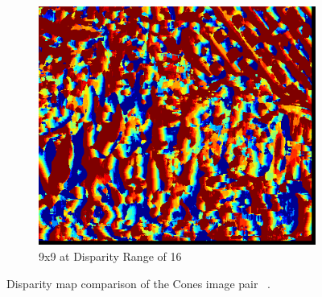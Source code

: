 \begin{figure}
\begin{center}
\begin{subfigure}{0.45\textwidth}
		\includegraphics[width=\textwidth]{figures/cones_9x9_python3.png}
		\caption{9x9 at Disparity Range of 16}
		\label{fig:conesPy}
	\end{subfigure}
	\captionfonts
	\caption{Disparity map comparison of the Cones image pair ~\cite{middlebury}.}
	\label{fig:conesDispMap}
\end{center}
\end{figure}




